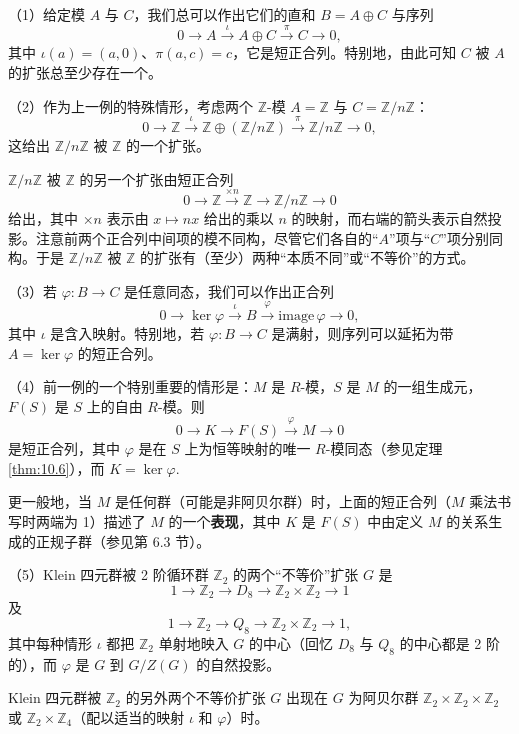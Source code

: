 \begin{example}
（1）给定模 \(A\) 与 \(C\)，我们总可以作出它们的直和 \(B = A \oplus C\) 与序列
\[
0 \longrightarrow A \xrightarrow{\iota} A \oplus C \xrightarrow{\pi} C \longrightarrow 0,
\]
其中 \(\iota(a) = (a, 0)\)、\(\pi(a, c) = c\)，它是短正合列。特别地，由此可知 \(C\) 被 \(A\) 的扩张总至少存在一个。

（2）作为上一例的特殊情形，考虑两个 \(\mathbb{Z}\)-模 \(A = \mathbb{Z}\) 与 \(C = \mathbb{Z}/n\mathbb{Z}\)：
\[
0 \longrightarrow \mathbb{Z} \xrightarrow{\iota} \mathbb{Z} \oplus (\mathbb{Z}/n\mathbb{Z}) \xrightarrow{\pi} \mathbb{Z}/n\mathbb{Z} \longrightarrow 0,
\]
这给出 \(\mathbb{Z}/n\mathbb{Z}\) 被 \(\mathbb{Z}\) 的一个扩张。

\(\mathbb{Z}/n\mathbb{Z}\) 被 \(\mathbb{Z}\) 的另一个扩张由短正合列
\[
0 \longrightarrow \mathbb{Z} \xrightarrow{\times n} \mathbb{Z} \xrightarrow{\ \ } \mathbb{Z}/n\mathbb{Z} \longrightarrow 0
\]
给出，其中 \(\times n\) 表示由 \(x \mapsto nx\) 给出的乘以 \(n\) 的映射，而右端的箭头表示自然投影。注意前两个正合列中间项的模不同构，尽管它们各自的“\(A\)”项与“\(C\)”项分别同构。于是 \(\mathbb{Z}/n\mathbb{Z}\) 被 \(\mathbb{Z}\) 的扩张有（至少）两种“本质不同”或“不等价”的方式。

（3）若 \(\varphi : B \to C\) 是任意同态，我们可以作出正合列
\[
0 \longrightarrow \ker\varphi \xrightarrow{\iota} B \xrightarrow{\varphi} \mathrm{image}\,\varphi \longrightarrow 0,
\]
其中 \(\iota\) 是含入映射。特别地，若 \(\varphi : B \to C\) 是满射，则序列可以延拓为带 \(A = \ker\varphi\) 的短正合列。

（4）前一例的一个特别重要的情形是：\(M\) 是 \(R\)-模，\(S\) 是 \(M\) 的一组生成元，\(F(S)\) 是 \(S\) 上的自由 \(R\)-模。则
\[
0 \longrightarrow K \longrightarrow F(S) \xrightarrow{\varphi} M \longrightarrow 0
\]
是短正合列，其中 \(\varphi\) 是在 \(S\) 上为恒等映射的唯一 \(R\)-模同态（参见定理 \ref{thm:10.6}），而 \(K = \ker\varphi\).

更一般地，当 \(M\) 是任何群（可能是非阿贝尔群）时，上面的短正合列（\(M\) 乘法书写时两端为 1）描述了 \(M\) 的一个\textbf{表现}，其中 \(K\) 是 \(F(S)\) 中由定义 \(M\) 的关系生成的正规子群（参见第 6.3 节）。

（5）Klein 四元群被 2 阶循环群 \(\mathbb{Z}_2\) 的两个“不等价”扩张 \(G\) 是
\[
1 \longrightarrow \mathbb{Z}_2 \longrightarrow D_8 \longrightarrow \mathbb{Z}_2 \times \mathbb{Z}_2 \longrightarrow 1
\]
及
\[
1 \longrightarrow \mathbb{Z}_2 \longrightarrow Q_8 \longrightarrow \mathbb{Z}_2 \times \mathbb{Z}_2 \longrightarrow 1,
\]
其中每种情形 \(\iota\) 都把 \(\mathbb{Z}_2\) 单射地映入 \(G\) 的中心（回忆 \(D_8\) 与 \(Q_8\) 的中心都是 2 阶的），而 \(\varphi\) 是 \(G\) 到 \(G/Z(G)\) 的自然投影。

Klein 四元群被 \(\mathbb{Z}_2\) 的另外两个不等价扩张 \(G\) 出现在 \(G\) 为阿贝尔群 \(\mathbb{Z}_2 \times \mathbb{Z}_2 \times \mathbb{Z}_2\) 或 \(\mathbb{Z}_2 \times \mathbb{Z}_4\)（配以适当的映射 \(\iota\) 和 \(\varphi\)）时。
\end{example}


